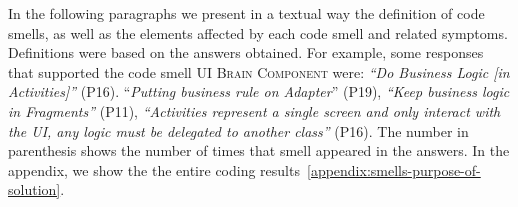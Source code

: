 In the following paragraphs we present in a textual way the definition of code smells, as well as the elements affected by each code smell and related symptoms. 
Definitions were based on the answers obtained. For example, some responses that supported the code smell \textsc{\small UI Brain Component} were: \textit{``Do Business Logic [in Activities]''} (P16). ``\textit{Putting business rule on Adapter}'' (P19), \textit{``Keep business logic in Fragments''} (P11), \textit{``Activities represent a single screen and only interact with the UI, any logic must be delegated to another class''} (P16). 
The number in parenthesis shows the number of times that smell appeared in the answers.
In the appendix, we show the the entire coding results~\ref{appendix:smells-purpose-of-solution}.

